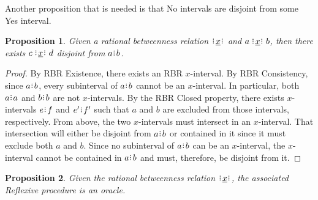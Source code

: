 \documentclass[12pt]{article}
\newtheorem{proposition}{Proposition}[section]
\begin{document}
Another proposition that is needed is that No intervals are disjoint from some Yes interval. 

\begin{proposition}
    Given  a rational betweenness relation $\xrel$ and \sout{$a\xrel b$}, then there exists $c \xrel d$ disjoint from $a\rint b$.
\end{proposition}

\begin{proof}
    By RBR Existence, there exists an RBR $x$-interval. By RBR Consistency,  since \sout{$a\rint b$}, every subinterval of $a \rint b$ cannot be an $x$-interval. In particular, both $a\rint a$ and $b\rint b$ are not $x$-intervals. By the RBR Closed property, there exists $x$-intervals $e\rint f$ and $e'\rint f'$ such that $a$ and $b$ are excluded from those intervals, respectively. From above, the two $x$-intervals must intersect in an $x$-interval. That intersection will either be disjoint from $a\rint b$ or contained in it since it must exclude both $a$ and $b$. Since no subinterval of $a \rint b$ can be an $x$-interval, the $x$-interval cannot be contained in $a \rint b$ and must, therefore, be disjoint from it. 
\end{proof}

\begin{proposition}
    Given the rational betweenness relation $\xrel$, the associated Reflexive procedure is an oracle. 
\end{proposition}
\end{document}
